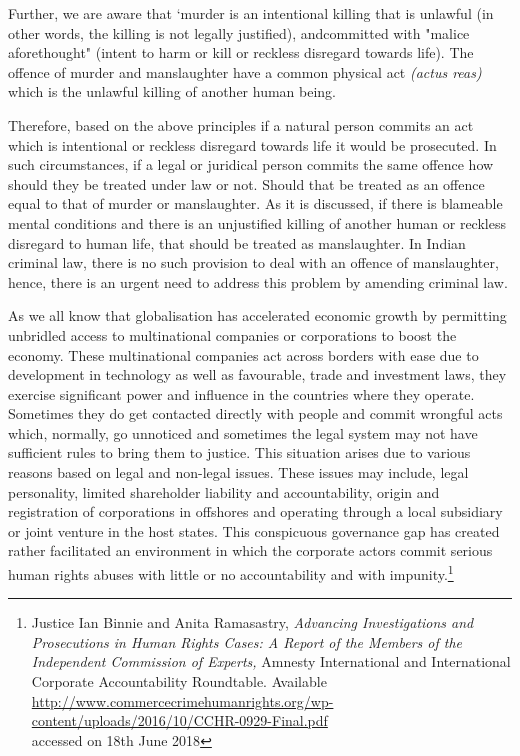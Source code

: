 \begin{multicols}{2}
\noi
Further, we are aware that ‘murder is an intentional killing that is unlawful (in other
words, the killing is not legally justified), andcommitted with "malice aforethought"
(intent to harm or kill or reckless disregard towards life). The offence of murder and
manslaughter have a common physical act \textit{(actus reas)} which is the unlawful killing of
another human being.

\noi
Therefore, based on the above principles if a natural person commits an act which is
intentional or reckless disregard towards life it would be prosecuted. In such
circumstances, if a legal or juridical person commits the same offence how should
they be treated under law or not. Should that be treated as an offence equal to that of
murder or manslaughter. As it is discussed, if there is blameable mental conditions
and there is an unjustified killing of another human or reckless disregard to human
life, that should be treated as manslaughter. In Indian criminal law, there is no such
provision to deal with an offence of manslaughter, hence, there is an urgent need to
address this problem by amending criminal law.

\noi
As we all know that globalisation has accelerated economic growth by permitting
unbridled access to multinational companies or corporations to boost the economy.
These multinational companies act across borders with ease due to development in technology as well as favourable, trade and investment laws, they exercise significant
power and influence in the countries where they operate. Sometimes they do get
contacted directly with people and commit wrongful acts which, normally, go
unnoticed and sometimes the legal system may not have sufficient rules to bring them
to justice. This situation arises due to various reasons based on legal and non-legal
issues. These issues may include, legal personality, limited shareholder liability and
accountability, origin and registration of corporations in offshores and operating
through a local subsidiary or joint venture in the host states. This conspicuous
governance gap has created rather facilitated an environment in which the corporate
actors commit serious human rights abuses with little or no accountability and with
impunity.\footnote{Justice Ian Binnie and Anita Ramasastry, \textit{Advancing Investigations and Prosecutions in Human Rights
Cases: A Report of the Members of the Independent Commission of Experts,} Amnesty International and International Corporate Accountability Roundtable. Available \url{http://www.commercecrimehumanrights.org/wp-content/uploads/2016/10/CCHR-0929-Final.pdf}\\ accessed on 18th June 2018}


\end{multicols}
